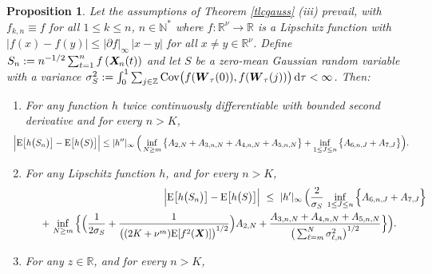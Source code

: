 \documentclass[10pt]{article}
\def\N{\mathbb{N}}
\def\R{\mathbb{R}}
\def\Z{\mathbb{Z}}
\def\E{\mathrm E}
\newcommand{\mbf}[1]{\mbox{\boldmath $#1$}}
\def\limiten{\renewcommand{\arraystretch}{0.5}
\begin{array}[t]{c}
\stackrel{}{\longrightarrow} \\
{\scriptstyle n\rightarrow\infty}
\end{array}\renewcommand{\arraystretch}{1}}
\newtheorem{prop}{Proposition}
\begin{document}
\begin{prop}\label{berry}
Let the assumptions of Theorem \ref{tlcgauss} (iii) prevail, with $f_{k,n}\equiv f$ for all $1\leq k \leq n$, $n\in \N^*$ where $f:\R^\nu\to \R $ is a Lipschitz function %
with
$|f(x)-f(y)|\leq | \partial f |_\infty \, | x-y|$ for all $x\neq y \in \R^\nu$.
Define  $S_n:=n^{-1/2} \sum_{t=1}^n f\left({\mbf X}_{\! n}(t)\right)$ and let $S$ be a zero-mean Gaussian random variable with a variance $\sigma_S^2:=\int_0^1  \sum_{j\in {\Z}} {\rm Cov}\big(
f({\mbf W}_\tau(0)), f({\mbf W}_\tau(j))\big)\, {\rm d}\tau <\infty$. Then:
\begin{enumerate}
\item[(i)] For any function $h$ twice continuously differentiable with bounded second derivative and for every $n>K$,
\begin{eqnarray}
\label{breuer1}
\hskip-.5cm \Big |\E \big [ h\big (S_n \big)\big ] -\E \big [ h\big ( S\big ) \big ] \Big | \leq |h''|_\infty \, \Big(\inf_{N\geq m}\big \{A_{2,N}+ A_{3,n,N}+ A_{4,n,N}+A_{5,n,N}\big \} + \inf_{1\le J\le n}\big \{ A_{6,n,J}+A_{7,J}\big \} \Big ). \qquad
\end{eqnarray}
\item[(ii)] For any Lipschitz function $h$, and for every $n>K$,
\begin{eqnarray}
\nonumber  && \hskip-1.5cm \Big |\E\big [h\big (S_n\big ) \big ]- \E \big [ h\big (S\big )\big ]\Big |\ \leq \
|h'|_\infty\, \Big  ( \frac 2 {\sigma_S} \, \inf_{1 \le J\le n}\Big \{ A_{6,n,J}+A_{7,J}\Big \}    \\
\label{mainestimate2} && \hspace{.2cm} + \, \inf _{N\geq m} \Big   \{ \Big (\frac 1 {2 \sigma_S}
+ \frac 1 {\big(  (2K+\nu^m)\E[f^2({\mbf X})] \big )^{1/2}} \Big )  A_{2,N}
+    \frac{A_{3,n,N} + A_{4,n,N}+A_{5,n,N}}{\big ( \sum_{\ell=m}^N \sigma_{\ell,n}^2 \big )^{1/2}} \Big \}  \Big  ). \quad \qquad
\end{eqnarray}
\item[(iii)] For any $z\in\R$, and for every $n>K$,

\end{enumerate}
\end{prop}
\end{document}
